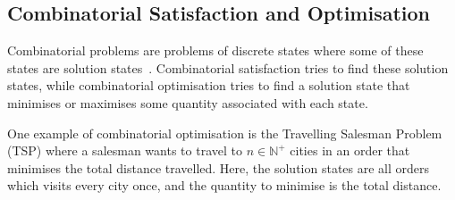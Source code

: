 \documentclass[a4paper,12pt]{article}
\newcommand{\elnaturale}{\mathbb{N}}
\begin{document}



\subsection{Combinatorial Satisfaction and Optimisation}\label{sec:csp}


Combinatorial problems are problems of discrete states where some of these states are
solution states~\cite{combopt}. Combinatorial satisfaction tries to find these solution states,
while combinatorial optimisation tries to find a solution state that minimises or
maximises some quantity associated with each state.

One example of combinatorial optimisation is the Travelling Salesman Problem (TSP) where a
salesman wants to travel to $n \in \elnaturale^+$ cities in an order that minimises the total
distance travelled. Here, the solution states are all orders which visits every city once, and the
quantity to minimise is the total distance.
\end{document}
